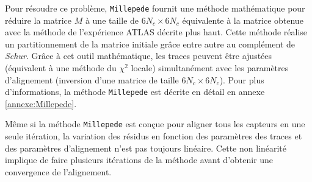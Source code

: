   \medskip
  
  Pour r\'esoudre ce probl\`eme, \texttt{Millepede} fournit une m\'ethode math\'ematique pour r\'eduire la matrice $M$ \`a une taille de $6 N_c \times 6 N_c$ \'equivalente \`a la matrice obtenue avec la m\'ethode de l'exp\'erience ATLAS d\'ecrite plus haut. Cette m\'ethode r\'ealise un partitionnement de la matrice initiale gr\^ace entre autre au compl\'ement de \textit{Schur}. Gr\^ace \`a cet outil math\'ematique, les traces peuvent \^etre ajust\'ees (\'equivalent \`a une m\'ethode du $\chi^2$ locale) simultan\'ement avec les param\`etres d'alignement (inversion d'une matrice de taille $6 N_c \times 6 N_c$). Pour plus d'informations, la m\'ethode \texttt{Millepede} est d\'ecrite en d\'etail en annexe \ref{annexe:Millepede}.
  
  \medskip
  
  M\^eme si la m\'ethode \texttt{Millepede} est conçue pour aligner tous les capteurs en une seule it\'eration, la variation des r\'esidus en fonction des param\`etres des traces et des param\`etres d'alignement n'est pas toujours lin\'eaire. Cette non lin\'earit\'e implique de faire plusieurs it\'erations de la m\'ethode avant d'obtenir une convergence de l'alignement.
%    
%    
  
